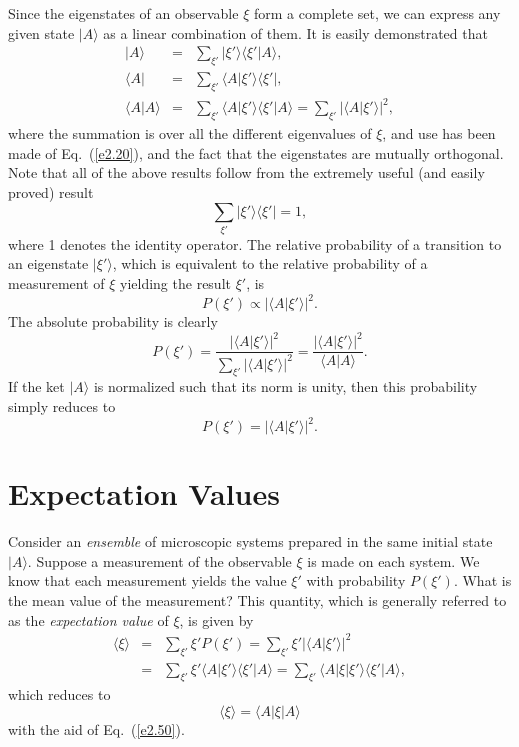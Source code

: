 Since the eigenstates of an observable $\xi$  form a complete
set, we can express any given state $|A\rangle$ as a linear combination of them.
It is easily demonstrated that
\begin{eqnarray}\label{e2.49a}
|A\rangle &= &\sum_{\xi'} |\xi'\rangle \langle\xi'|A\rangle,\\[0.5ex]
\langle A|&= &\sum_{\xi'} \langle A|\xi'\rangle \langle\xi'|,\\[0.5ex]
\langle A|A\rangle&=& \sum_{\xi'} \langle A|\xi'\rangle
 \langle\xi'|A\rangle 
= \sum_{\xi'}|\langle A|\xi' \rangle|^2,\label{e2.49c}
\end{eqnarray}
where the summation is over all the different eigenvalues of
$\xi$, and use has been
made of Eq.~(\ref{e2.20}), and
the fact that the eigenstates are mutually  orthogonal. Note that all of the
above results follow from the extremely useful (and easily proved) result
\begin{equation}\label{e2.50}
\sum_{\xi'} |\xi'\rangle \langle \xi'| = 1,
\end{equation}
where 1 denotes the identity operator.
The relative
probability of a transition to an eigenstate $|\xi'\rangle$, which is
equivalent to 
the relative probability of a measurement of $\xi$ yielding the result $\xi'$, is
\begin{equation}
P(\xi') \propto |\langle A| \xi'\rangle|^2.
\end{equation}
The absolute probability 
is clearly
\begin{equation}
P(\xi') = \frac{ |\langle A| \xi'\rangle|^2}{\sum_{\xi'}|\langle A| \xi'\rangle|^2}
=\frac{|\langle A| \xi'\rangle|^2}{\langle A|A\rangle}.
\end{equation}
If the ket  $|A\rangle$ is normalized such that its norm is unity,  then this
probability simply reduces to
\begin{equation}
P(\xi')= |\langle A| \xi'\rangle|^2.
\end{equation}

\section{Expectation Values}
Consider an {\em ensemble} of microscopic systems  prepared in the
same initial state $|A\rangle$. Suppose a measurement of the observable $\xi$ is
made on each  system. We know that each  measurement yields the value $\xi'$ with
probability $P(\xi')$. What is the mean value of the measurement? This quantity,
which is generally referred to as the {\em expectation value} of $\xi$, is
given by
\begin{eqnarray}
\langle\xi\rangle &=&
 \sum_{\xi'} \xi' P(\xi') = \sum_{\xi'} \xi'|\langle A|\xi'\rangle|^2\nonumber
\\[0.5ex]
&=& \sum_{\xi'} \xi' \langle A|\xi'\rangle \langle \xi' | A\rangle
= \sum_{\xi'} \langle A|\xi|\xi'\rangle \langle \xi'|A\rangle,
\end{eqnarray}
which reduces to 
\begin{equation}
\langle\xi\rangle = \langle A|\xi|A\rangle
\end{equation}
with the aid of Eq.~(\ref{e2.50}). 

